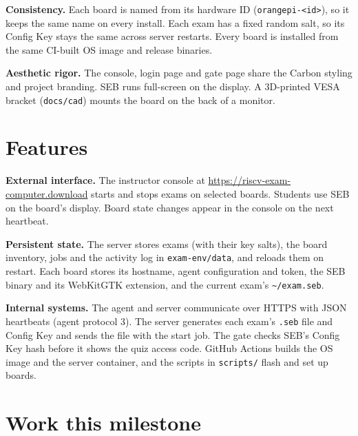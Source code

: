 \documentclass[11pt]{article}
\begin{document}
\textbf{Consistency.} Each board is named from its hardware ID (\texttt{orangepi-<id>}), so it keeps the same name on every install. Each exam has a fixed random salt, so its Config Key stays the same across server restarts. Every board is installed from the same CI-built OS image and release binaries.

\textbf{Aesthetic rigor.} The console, login page and gate page share the Carbon styling and project branding. SEB runs full-screen on the display. A 3D-printed VESA bracket (\texttt{docs/cad}) mounts the board on the back of a monitor.

\section{Features}

\textbf{External interface.} The instructor console at \url{https://riscv-exam-computer.download} starts and stops exams on selected boards. Students use SEB on the board's display. Board state changes appear in the console on the next heartbeat.

\textbf{Persistent state.} The server stores exams (with their key salts), the board inventory, jobs and the activity log in \texttt{exam-env/data}, and reloads them on restart. Each board stores its hostname, agent configuration and token, the SEB binary and its WebKitGTK extension, and the current exam's \texttt{\textasciitilde/exam.seb}.

\textbf{Internal systems.} The agent and server communicate over HTTPS with JSON heartbeats (agent protocol 3). The server generates each exam's \texttt{.seb} file and Config Key and sends the file with the start job. The gate checks SEB's Config Key hash before it shows the quiz access code. GitHub Actions builds the OS image and the server container, and the scripts in \texttt{scripts/} flash and set up boards.

\section{Work this milestone}
\end{document}
